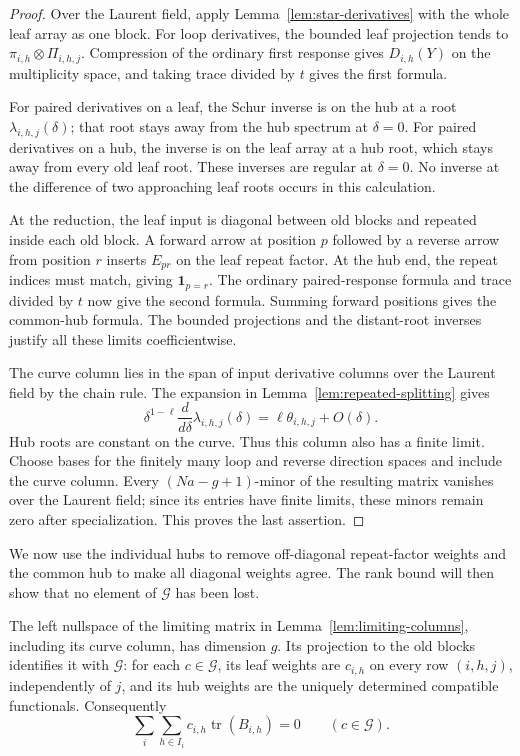 \begin{proof}
Over the Laurent field, apply Lemma~\ref{lem:star-derivatives} with
the whole leaf array as one block. For loop derivatives, the
bounded leaf projection tends to
\(\pi_{i,h}\otimes\Pi_{i,h,j}\). Compression of the ordinary
first response gives \(D_{i,h}(Y)\) on the multiplicity space,
and taking trace divided by \(t\) gives the first formula.

For paired derivatives on a leaf, the Schur inverse is on the hub
at a root \(\lambda_{i,h,j}(\delta)\); that root stays away from
the hub spectrum at \(\delta=0\). For paired derivatives on a
hub, the inverse is on the leaf array at a hub root, which stays
away from every old leaf root. These inverses are regular at
\(\delta=0\). No inverse at the difference of two approaching
leaf roots occurs in this calculation.

At the reduction, the leaf input is diagonal between old blocks
and repeated inside each old block. A forward arrow at position
\(p\) followed by a reverse arrow from position \(r\) inserts
\(E_{pr}\) on the leaf repeat factor. At the hub end, the repeat
indices must match, giving \(\mathbf 1_{p=r}\). The ordinary
paired-response formula and trace divided by \(t\) now give the
second formula. Summing forward positions gives the common-hub
formula. The bounded projections and the distant-root inverses
justify all these limits coefficientwise.

The curve column lies in the span of input derivative columns over
the Laurent field by the chain rule. The expansion in
Lemma~\ref{lem:repeated-splitting} gives
\[
 \delta^{1-\ell}\frac{d}{d\delta}
       \lambda_{i,h,j}(\delta)
 =\ell\theta_{i,h,j}+O(\delta).
\]
Hub roots are constant on the curve. Thus this column also has a
finite limit. Choose bases for the finitely many loop and reverse
direction spaces and include the curve column. Every
\((Na-g+1)\)-minor of the resulting matrix vanishes over the
Laurent field; since its entries have finite limits, these minors
remain zero after specialization. This proves the last assertion.
\end{proof}

We now use the individual hubs to remove off-diagonal repeat-factor
weights and the common hub to make all diagonal weights agree.
The rank bound will then show that no element of \(\mathcal G\)
has been lost.

\begin{lemma}
\label{lem:hub-nullspace}
The left nullspace of the limiting matrix in
Lemma~\ref{lem:limiting-columns}, including its curve column,
has dimension \(g\). Its projection to the old blocks identifies
it with \(\mathcal G\): for each \(c\in\mathcal G\), its leaf
weights are \(c_{i,h}\) on every row \((i,h,j)\), independently
of \(j\), and its hub weights are the uniquely determined
compatible functionals. Consequently
\begin{equation}
 \sum_i\sum_{h\in I_i}c_{i,h}\operatorname{tr}(B_{i,h})=0
 \qquad(c\in\mathcal G).
 \label{eq:error-matrix-trace}
\end{equation}
\end{lemma}

